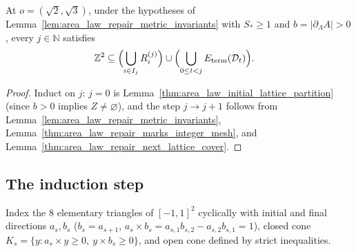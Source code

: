 \begin{lemma}
    \label{thm:area_law_repair_lattice_cover_before}
    \leanok
    At $o=(\sqrt2,\sqrt3)$, under the hypotheses of Lemma~\ref{lem:area_law_repair_metric_invariants}
    with $S_*\ge1$ and $b=|\partial_\Lambda A|>0$, every $j\in\mathbb N$ satisfies
    \begin{align}
        \mathbb Z^2
         & \subseteq\Bigl(\bigcup_{i\in I_j}R_i^{(j)}\Bigr)
        \cup\Bigl(\bigcup_{0\le t<j}E_{\mathrm{term}}(\mathcal D_t)\Bigr).
        \label{eq:area_law_repair_lattice_cover_before}
    \end{align}
\end{lemma}

\begin{proof}
    \leanok
    Induct on $j$: $j=0$ is Lemma~\ref{thm:area_law_initial_lattice_partition} (since $b>0$ implies
    $Z\ne\varnothing$), and the step $j\to j+1$ follows from
    Lemma~\ref{lem:area_law_repair_metric_invariants}, Lemma~\ref{thm:area_law_repair_marks_integer_mesh},
    and Lemma~\ref{thm:area_law_repair_next_lattice_cover}.
\end{proof}

\subsection{The induction step}
\label{sec:area_law_repair_induction_step}

Index the $8$ elementary triangles of $[-1,1]^2$ cyclically with initial and final directions
$a_s,b_s$ ($b_s=a_{s+1}$, $a_s\times b_s=a_{s,1}b_{s,2}-a_{s,2}b_{s,1}=1$), closed cone
$K_s=\{y:a_s\times y\ge0,\ y\times b_s\ge0\}$, and open cone defined by strict inequalities.

